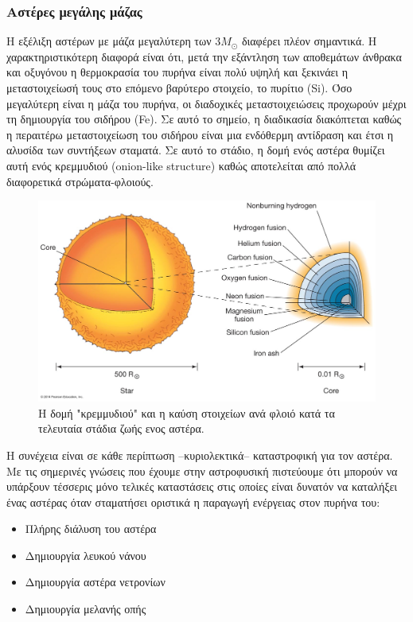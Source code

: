 \subsubsection{Αστέρες μεγάλης μάζας}
Η εξέλιξη αστέρων με μάζα μεγαλύτερη των $3M_{\odot}$ διαφέρει πλέον σημαντικά. Η χαρακτηριστικότερη διαφορά είναι ότι, μετά την εξάντληση των αποθεμάτων άνθρακα και οξυγόνου η θερμοκρασία του πυρήνα είναι πολύ υψηλή και ξεκινάει η μεταστοιχείωσή τους στο επόμενο βαρύτερο στοιχείο, το πυρίτιο (Si). Όσο μεγαλύτερη είναι η μάζα του πυρήνα, οι διαδοχικές μεταστοιχειώσεις προχωρούν μέχρι τη δημιουργία του σιδήρου (Fe). Σε αυτό το σημείο, η διαδικασία διακόπτεται καθώς η περαιτέρω μεταστοιχείωση του σιδήρου είναι μια ενδόθερμη αντίδραση και έτσι η αλυσίδα των συντήξεων σταματά. Σε αυτό το στάδιο, η δομή ενός αστέρα θυμίζει αυτή ενός κρεμμυδιού (onion-like structure) καθώς αποτελείται από πολλά διαφορετικά στρώματα-φλοιούς.
\begin{figure}[h!]
    \centering
    \includegraphics[scale=0.4]{Figures/onion_stellar_structure.jpg}
    \caption{Η δομή "κρεμμυδιού" και η καύση στοιχείων ανά φλοιό κατά τα τελευταία στάδια ζωής ενος αστέρα.}
    \label{fig:onion_stellar_structure}
\end{figure}

Η συνέχεια είναι σε κάθε περίπτωση --κυριολεκτικά-- καταστροφική για τον αστέρα. Με τις σημερινές γνώσεις που έχουμε στην αστροφυσική πιστεύουμε ότι μπορούν να υπάρξουν τέσσερις μόνο τελικές καταστάσεις στις οποίες είναι δυνατόν να καταλήξει ένας αστέρας όταν σταματήσει οριστικά η παραγωγή ενέργειας στον πυρήνα του: 

\begin{itemize}
\item Πλήρης διάλυση του αστέρα
\item Δημιουργία λευκού νάνου
\item Δημιουργία αστέρα νετρονίων
\item Δημιουργία μελανής οπής
\end{itemize}

